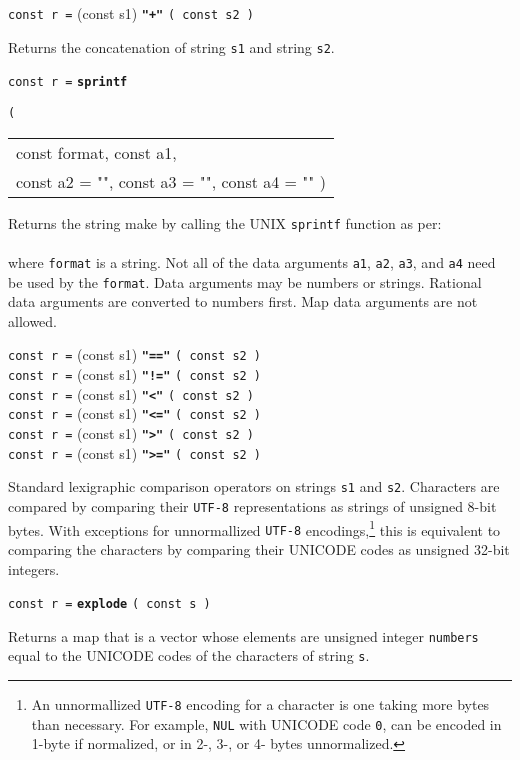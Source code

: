 \documentclass[12pt]{article}
\newcommand{\ttkey}[1]{{\tt \bfseries #1}}
\newenvironment{indpar}[1][0.3in]%
	{\begin{list}{}%
		     {\setlength{\itemsep}{0in}%
		      \setlength{\topsep}{0in}%
		      \setlength{\parsep}{1ex}%
		      \setlength{\labelwidth}{#1}%
		      \setlength{\leftmargin}{#1}%
		      \addtolength{\leftmargin}{\labelsep}}%
	 \item}%
	{\end{list}}
\begin{document}
{\tt const r =} (const s1) \ttkey{"+"} {\tt ( const s2 )}
\begin{indpar}
Returns the concatenation of string {\tt s1}
and string {\tt s2}.
\end{indpar}

{\tt const r =} \ttkey{sprintf}
    {\tt ( \begin{tabular}[t]{@{}l}
            const format, const a1, \\
	    const a2 = "", const a3 = "", const a4 = "" )
	    \end{tabular} }
\begin{indpar}
Returns the string make by calling the UNIX {\tt sprintf} function as per: \\
\hspace*{1in}{\tt sprintf ( format, a1, a2, a3, a4 )} \\
where {\tt format} is a string.  Not all of the data arguments
{\tt a1}, {\tt a2}, {\tt a3}, and {\tt a4} need be used by the {\tt format}.
Data arguments may be numbers or strings.
Rational data arguments are converted to numbers first.  Map data arguments
are not allowed.
\end{indpar}

{\tt const r =} (const s1) \ttkey{"=="} {\tt ( const s2 )} \\
{\tt const r =} (const s1) \ttkey{"!="} {\tt ( const s2 )} \\
{\tt const r =} (const s1) \ttkey{"<"} {\tt ( const s2 )} \\
{\tt const r =} (const s1) \ttkey{"<="} {\tt ( const s2 )} \\
{\tt const r =} (const s1) \ttkey{">"} {\tt ( const s2 )} \\
{\tt const r =} (const s1) \ttkey{">="} {\tt ( const s2 )}
\begin{indpar}
Standard lexigraphic comparison operators on strings {\tt s1} and {\tt s2}.
Characters are compared by comparing their {\tt UTF-8} representations
as strings of unsigned 8-bit bytes.  With exceptions for unnormallized
{\tt UTF-8} encodings,\footnote{
An unnormallized {\tt UTF-8} encoding for a character is one taking
more bytes than necessary.  For example, {\tt NUL} with UNICODE code {\tt 0},
can be encoded in 1-byte if normalized, or in 2-, 3-, or 4- bytes
unnormalized.}
this is equivalent to comparing the characters
by comparing their UNICODE codes as unsigned 32-bit integers.
\end{indpar}

{\tt const r =} \ttkey{explode} {\tt ( const s )}
\begin{indpar}
Returns a map that is a vector whose elements are unsigned integer {\tt numbers}
equal to the UNICODE codes of the characters of string {\tt s}.
\end{indpar}
\end{document}
